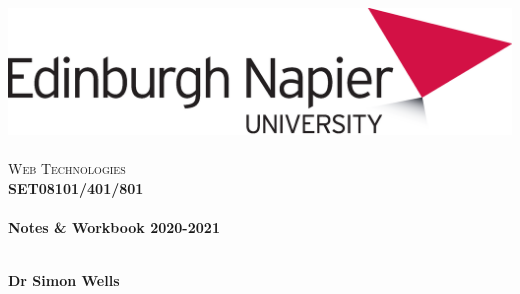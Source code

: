 \documentclass[12pt, a4paper, oneside]{book}
\begin{document}
\frontmatter

\begin{titlepage}
\vspace*{5cm}
\begin{center}
\includegraphics[width=.5\textwidth]{figures/EdNapUniLogoCMYK}~\\[1cm]

\textsc{\Large Web Technologies}\\[1.5cm]

\textsc{\LARGE \bfseries SET08101/401/801 }\\[0.5cm]

\hrulefill \\[0.4cm]
{\huge \bfseries Notes \& Workbook 2020-2021 \\[0.4cm] }
\hrulefill \\[1.5cm]

\begin{minipage}{0.4\textwidth}
\begin{flushleft} \large
\textbf{Dr Simon Wells} \\
\end{flushleft}
\end{minipage}

\vfill

\end{center}
\end{titlepage}

\setcounter{tocdepth}{2}
\cleardoublepage
\tableofcontents
{}

\mainmatter




















\backmatter




\end{document}
